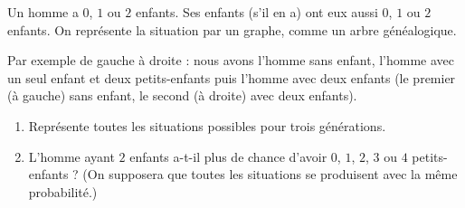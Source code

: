 \documentclass[class=report,crop=false, 12pt]{standalone}
\begin{document}
\begin{activite}
Un homme a $0$, $1$ ou $2$ enfants. Ses enfants (s'il en a) ont eux aussi $0$, $1$ ou $2$ enfants.
On représente la situation par un graphe, comme un arbre généalogique.

Par exemple de gauche à droite : nous avons l'homme sans enfant, l'homme avec un seul enfant et deux petits-enfants puis l'homme avec deux enfants (le premier (à gauche) sans enfant, le second (à droite) avec deux enfants).

   

\begin{enumerate}
  \item	Représente toutes les situations possibles pour trois générations.
  
  \item L'homme ayant $2$ enfants a-t-il plus de chance d'avoir $0$, $1$, $2$, $3$ ou $4$ petits-enfants ? (On supposera que toutes les situations se produisent avec la même probabilité.)
  
\end{enumerate}
   
   
\end{activite}
\end{document}
